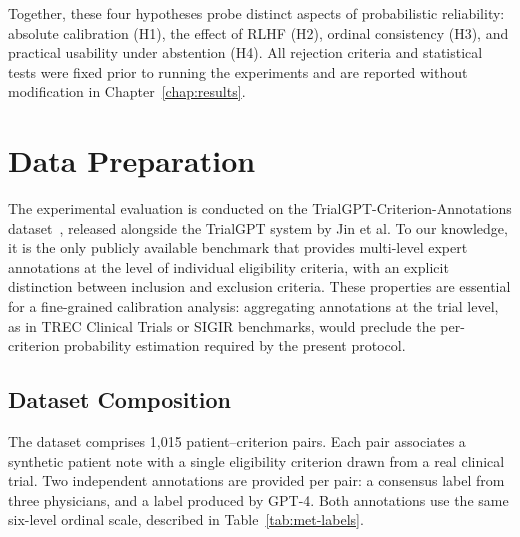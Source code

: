 Together, these four hypotheses probe distinct aspects of probabilistic 
reliability: absolute calibration (H1), the effect of RLHF (H2), ordinal 
consistency (H3), and practical usability under abstention (H4). All 
rejection criteria and statistical tests were fixed prior to running the 
experiments and are reported without modification in Chapter~\ref{chap:results}.

\section{Data Preparation}
\label{sec:met-data}

The experimental evaluation is conducted on the TrialGPT-Criterion-Annotations 
dataset~\cite{jin2024trialgpt}, released alongside the TrialGPT system by 
Jin et al. To our knowledge, it is the only publicly available benchmark that 
provides multi-level expert annotations at the level of individual eligibility 
criteria, with an explicit distinction between inclusion and exclusion 
criteria. These properties are essential for a fine-grained calibration 
analysis: aggregating annotations at the trial level, as in TREC Clinical 
Trials or SIGIR benchmarks, would preclude the per-criterion probability 
estimation required by the present protocol.

\subsection{Dataset Composition}
\label{subsec:met-data-composition}

The dataset comprises 1{,}015 patient--criterion pairs. Each pair associates 
a synthetic patient note with a single eligibility criterion drawn from a 
real clinical trial. Two independent annotations are provided per pair: a 
consensus label from three physicians, and a label produced by GPT-4. Both 
annotations use the same six-level ordinal scale, described in 
Table~\ref{tab:met-labels}.

